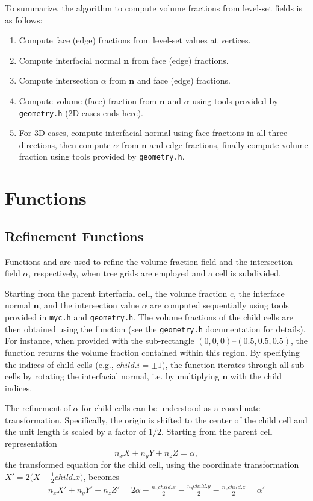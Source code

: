 To summarize, the algorithm to compute volume fractions from level-set fields is as follows:
\begin{enumerate}
  \item Compute face (edge) fractions from level-set values at vertices.
  \item Compute interfacial normal $\mathbf{n}$ from face (edge) fractions.
  \item Compute intersection $\alpha$ from $\mathbf{n}$ and face (edge) fractions.
  \item Compute volume (face) fraction from $\mathbf{n}$ and $\alpha$ using tools provided by \texttt{geometry.h} (2D cases ends here).
  \item For 3D cases, compute interfacial normal using face fractions in all three directions, then compute $\alpha$ from $\mathbf{n}$ and edge fractions, finally compute volume fraction using tools provided by \texttt{geometry.h}.
\end{enumerate}

\section{Functions}

\subsection{Refinement Functions}

Functions  and  are used to refine the volume fraction field and the intersection field $\alpha$, respectively, when tree grids are employed and a cell is subdivided.

Starting from the parent interfacial cell, the volume fraction $c$, the interface normal $\mathbf{n}$, and the intersection value $\alpha$ are computed sequentially using tools provided in \texttt{myc.h} and \texttt{geometry.h}. The volume fractions of the child cells are then obtained using the function  (see the \texttt{geometry.h} documentation for details). For instance, when provided with the sub-rectangle $(0,0,0)$--$(0.5,0.5,0.5)$, the function returns the volume fraction contained within this region. By specifying the indices of child cells (e.g., $child.i = \pm 1$), the function iterates through all sub-cells by rotating the interfacial normal, i.e. by multiplying $\mathbf{n}$ with the child indices.

The refinement of $\alpha$ for child cells can be understood as a coordinate transformation. Specifically, the origin is shifted to the center of the child cell and the unit length is scaled by a factor of $1/2$. Starting from the parent cell representation
\begin{equation}
  n_x X + n_y Y + n_z Z = \alpha,
\end{equation}
the transformed equation for the child cell, using the coordinate transformation
$X' = 2\bigl(X - \tfrac{1}{2} child.x\bigr)$, becomes
\begin{equation}
  n_x X' + n_y Y' + n_z Z' =
  2\alpha - \tfrac{n_x child.x}{2} - \tfrac{n_y child.y}{2}
        - \tfrac{n_z child.z}{2} = \alpha'
\end{equation}
